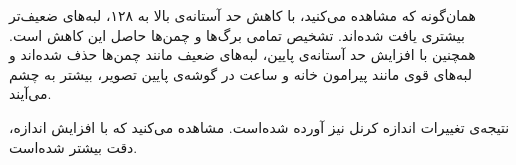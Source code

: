 \documentclass[12pt,a4paper]{article}
\theoremstyle{definition}
\theoremstyle{theorem}
\theoremstyle{definition}
\begin{document}
\vspace{0.2cm}
\begin{center}
\end{center}
همان‌گونه که مشاهده می‌کنید، با کاهش حد آستانه‌ی بالا به ۱۲۸، لبه‌های ضعیف‌تر بیشتری یافت شده‌اند. تشخیص تمامی برگ‌ها و چمن‌ها حاصل این کاهش است.
همچنین با افزایش حد آستانه‌ی پایین، لبه‌های ضعیف مانند چمن‌ها حذف شده‌اند و لبه‌های قوی مانند پیرامون خانه و ساعت در گوشه‌ی پایین تصویر، بیشتر به چشم می‌آیند.

نتیجه‌ی تغییرات اندازه کرنل نیز آورده شده‌است. مشاهده می‌کنید که با افزایش اندازه، دقت بیشتر شده‌است. 
\end{document}
